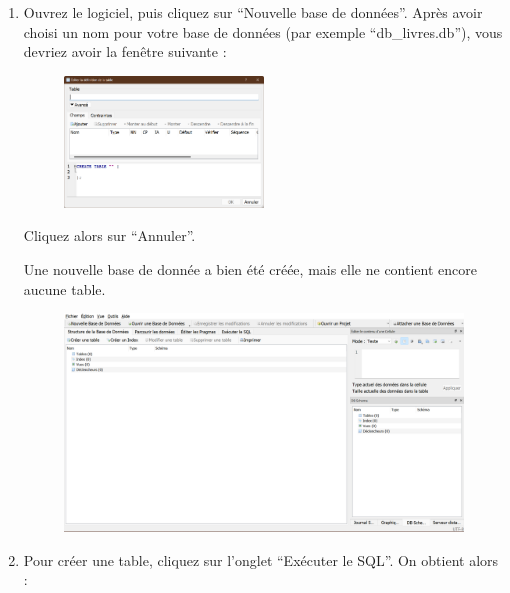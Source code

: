 \documentclass[
  a4paper,
  DIV=11,
  numbers=noendperiod]{scrartcl}
\begin{document}
\begin{enumerate}
\def\labelenumi{\arabic{enumi}.}
\item
  Ouvrez le logiciel, puis cliquez sur ``Nouvelle base de données''.
  Après avoir choisi un nom pour votre base de données (par exemple
  ``db\_livres.db''), vous devriez avoir la fenêtre suivante :

  \begin{figure}

  {\centering \includegraphics[width=0.5\textwidth,height=\textheight]{TP1_1.png}

  }

  \end{figure}

  Cliquez alors sur ``Annuler''.

  Une nouvelle base de donnée a bien été créée, mais elle ne contient
  encore aucune table.

  \begin{figure}

  {\centering \includegraphics{TP1_2.png}

  }

  \end{figure}
\item
  Pour créer une table, cliquez sur l'onglet ``Exécuter le SQL''. On
  obtient alors :

  \begin{figure}


\end{figure}
\end{enumerate}
\end{document}
